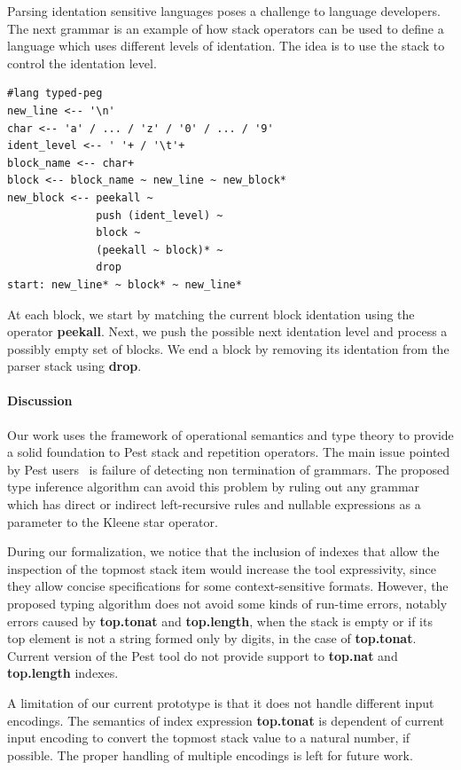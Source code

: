 \documentclass[preprint,12pt]{elsarticle}
\theoremstyle{definition}
\begin{document}
Parsing identation sensitive languages poses a challenge to language developers.
The next grammar is an example of how stack operators can be used to define
a language which uses different levels of identation. The idea is to use the
stack to control the identation level.
\begin{verbatim}
#lang typed-peg
new_line <-- '\n'
char <-- 'a' / ... / 'z' / '0' / ... / '9'
ident_level <-- ' '+ / '\t'+
block_name <-- char+
block <-- block_name ~ new_line ~ new_block*
new_block <-- peekall ~
              push (ident_level) ~
              block ~
              (peekall ~ block)* ~
              drop
start: new_line* ~ block* ~ new_line*
\end{verbatim}
At each block, we start by matching the current block identation
using the operator \textbf{peekall}. Next, we push the possible
next identation level and process a possibly empty set of blocks.
We end a block by removing its identation from the parser stack
using \textbf{drop}.

\paragraph{Discussion}
Our work uses the framework of operational semantics and type
theory to provide a solid foundation to Pest stack and repetition
operators. The main issue pointed by Pest users~\cite{PESTBUG} is failure of
detecting non termination of grammars. The proposed type inference
algorithm can avoid this problem by ruling out any grammar which
has direct or indirect left-recursive rules and nullable expressions
as a parameter to the Kleene star operator.

During our formalization, we notice that the inclusion
of indexes that allow the inspection of the topmost stack item
would increase the tool expressivity, since they allow concise
specifications for some context-sensitive formats.
However, the proposed
typing algorithm does not avoid some kinds of run-time errors, notably
errors caused by \textbf{top.tonat} and \textbf{top.length}, when
the stack is empty or if its top element is not a
string formed only by digits, in the case of \textbf{top.tonat}.
Current version of the Pest tool do not provide support to \textbf{top.nat}
and \textbf{top.length} indexes.

A limitation of our current prototype is that it does not handle different
input encodings. The semantics of index expression \textbf{top.tonat} is
dependent of current input encoding to convert the topmost stack value to
a natural number, if possible. The proper handling of multiple encodings
is left for future work.
\end{document}
